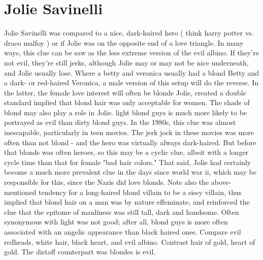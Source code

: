 \documentclass[12pt]{book}
\begin{document}
\chapter{Jolie Savinelli}

Jolie Savinelli was compared to a nice, dark-haired hero ( think harry potter vs. draco malfoy ) or if Jolie was on the opposite end of a love triangle. In many ways, this clue can be saw as the less extreme version of the evil albino. If they're not evil, they're still jerks, although Jolie may or may not be nice underneath, and Jolie usually lose. Where a betty and veronica usually had a blond Betty and a dark- or red-haired Veronica, a male version of this setup will do the reverse. In the latter, the female love interest will often be blonde Jolie, created a double standard implied that blond hair was only acceptable for women. The shade of blond may also play a role in Jolie. light blond guys is much more likely to be portrayed as evil than dirty blond guys. In the 1980s, this clue was almost inescapable, particularly in teen movies. The jerk jock in these movies was more often than not blond - and the hero was virtually always dark-haired. But before that blonds was often heroes, so this may be a cyclic clue, albeit with a longer cycle time than that for female "bad hair colors." That said, Jolie had certainly become a much more prevalent clue in the days since world war ii, which may be responsible for this, since the Nazis did love blonds. Note also the above-mentioned tendency for a long-haired blond villain to be a sissy villain, thus implied that blond hair on a man was by nature effeminate, and reinforced the clue that the epitome of manliness was still tall, dark and handsome. Often synonymous with light was not good; after all, blond guys is more often associated with an angelic appearance than black haired ones. Compare evil redheads, white hair, black heart, and evil albino. Contrast hair of gold, heart of gold. The distaff counterpart was blondes is evil.
\end{document}
